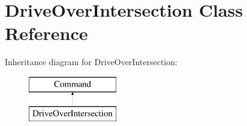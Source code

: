 \hypertarget{classDriveOverIntersection}{\section{Drive\-Over\-Intersection Class Reference}
\label{classDriveOverIntersection}
}
Inheritance diagram for Drive\-Over\-Intersection\-:\begin{figure}[H]
\begin{center}
\leavevmode
\includegraphics[height=2.000000cm]{classDriveOverIntersection}
\end{center}
\end{figure}
